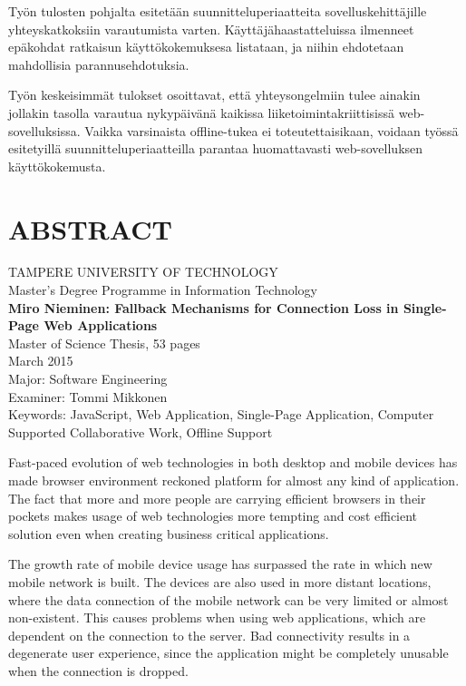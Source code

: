Työn tulosten pohjalta esitetään suunnitteluperiaatteita sovelluskehittäjille yh\-te\-ys\-kat\-kok\-siin varautumista varten. Käyttäjähaastatteluissa ilmenneet epäkohdat ratkaisun käyttökokemuksesa listataan, ja niihin ehdotetaan mahdollisia parannusehdotuksia.

Työn keskeisimmät tulokset osoittavat, että yhteysongelmiin tulee ainakin jollakin tasolla varautua nykypäivänä kaikissa liiketoimintakriittisissä web-sovelluksissa. Vaikka varsinaista offline-tukea ei toteutettaisikaan, voidaan työssä esitetyillä suunnitteluperiaatteilla parantaa huomattavasti web-sovelluksen käyttökokemusta.






\newpage
\chapter*{ABSTRACT}
\begin{spacing}{1.0}
\textsf{TAMPERE UNIVERSITY OF TECHNOLOGY}\\
\textsf{Master's Degree Programme in Information Technology}\\
{\bf \textsf{Miro Nieminen: Fallback Mechanisms for Connection Loss in Single-Page Web Applications}}\\
\textsf{Master of Science Thesis, 53 pages}\\
\textsf{March 2015}\\
\textsf{Major: Software Engineering}\\
\textsf{Examiner: Tommi Mikkonen}\\
\textsf{Keywords: JavaScript, Web Application, Single-Page Application, Computer Supported Collaborative Work, Offline Support}\\
\end{spacing}
 
Fast-paced evolution of web technologies in both desktop and mobile devices has made browser environment reckoned platform for almost any kind of application. The fact that more and more people are carrying efficient browsers in their pockets makes usage of web technologies more tempting and cost efficient solution even when creating business critical applications.

The growth rate of mobile device usage has surpassed the rate in which new mobile network is built. The devices are also used in more distant locations, where the data connection of the mobile network can be very limited or almost non-existent. This causes problems when using web applications, which are dependent on the connection to the server. Bad connectivity results in a degenerate user experience, since the application might be completely unusable when the connection is dropped.

